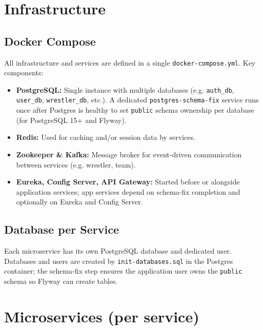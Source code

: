 \documentclass[11pt,a4paper]{article}
\begin{document}

\section{Infrastructure}

\subsection{Docker Compose}
All infrastructure and services are defined in a single \texttt{docker-compose.yml}. Key components:
\begin{itemize}
\item \textbf{PostgreSQL:} Single instance with multiple databases (e.g. \texttt{auth\_db}, \texttt{user\_db}, \texttt{wrestler\_db}, etc.). A dedicated \texttt{postgres-schema-fix} service runs once after Postgres is healthy to set \texttt{public} schema ownership per database (for PostgreSQL 15+ and Flyway).
\item \textbf{Redis:} Used for caching and/or session data by services.
\item \textbf{Zookeeper \& Kafka:} Message broker for event-driven communication between services (e.g. wrestler, team).
\item \textbf{Eureka, Config Server, API Gateway:} Started before or alongside application services; app services depend on schema-fix completion and optionally on Eureka and Config Server.
\end{itemize}

\subsection{Database per Service}
Each microservice has its own PostgreSQL database and dedicated user. Databases and users are created by \texttt{init-databases.sql} in the Postgres container; the schema-fix step ensures the application user owns the \texttt{public} schema so Flyway can create tables.


\section{Microservices (per service)}
\end{document}
